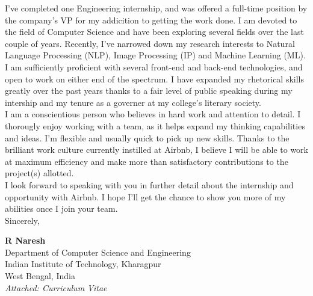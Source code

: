 \documentclass[a4paper,10pt]{extarticle} %
\begin{document}
I’ve completed one Engineering internship, and was offered a full-time position by the company’s VP for my addicition to getting the work done. I am devoted to the ﬁeld of Computer Science and have been exploring several ﬁelds over the last couple of years. Recently, I’ve narrowed down my research interests to Natural Language Processing (NLP), Image Processing (IP) and Machine Learning (ML). I am suﬃciently proﬁcient with several front-end and back-end technologies, and open to work on either end of the spectrum. I have expanded my rhetorical skills greatly over the past years thanks to a fair level of public speaking during my intership and my tenure as a governer at my college’s literary society. \\

I am a conscientious person who believes in hard work and attention to detail. I thorougly enjoy working with a team, as it helps expand my thinking capabilities and ideas. I’m ﬂexible and usually quick to pick up new skills. Thanks to the brilliant work culture currently instilled at Airbnb, I believe I will be able to work at maximum eﬃciency and make more than satisfactory contributions to the project(s) allotted.\\

I look forward to speaking with you in further detail about the internship and opportunity with Airbnb. I hope I’ll get the chance to show you more of my abilities once I join your team.\\

Sincerely,

\textbf{\large{R Naresh}}\\
Department of Computer Science and Engineering\\
Indian Institute of Technology, Kharagpur\\
West Bengal, India\\

\itshape{Attached: Curriculum Vitae}
\end{document}

